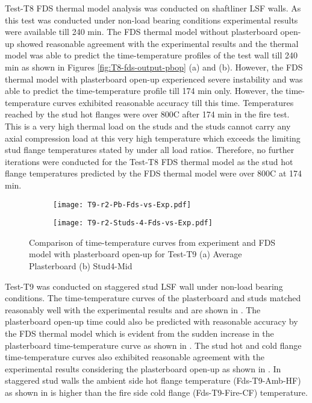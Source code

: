 Test-T8 FDS thermal model analysis was conducted on shaftliner LSF walls. As this test was conducted under non-load bearing conditions experimental results were available till 240 min. The FDS thermal model without plasterboard open-up showed reasonable agreement with the experimental results and the thermal model was able to predict the time-temperature profiles of the test wall till 240 min as shown in Figures \ref{fig:T8-fds-output-pbop} (a) and (b). However, the FDS thermal model with plasterboard open-up experienced severe instability and was able to predict the time-temperature profile till 174 min only. However, the time-temperature curves exhibited reasonable accuracy till this time. Temperatures reached by the stud hot flanges were over 800\degree C after 174 min in the fire test. This is a very high thermal load on the studs and the studs cannot carry any axial compression load at this very high temperature which exceeds the limiting stud flange temperatures stated by \citet{Gunalan2013a} under all load ratios. Therefore, no further iterations were conducted for the Test-T8 FDS thermal model as the stud hot flange temperatures predicted by the FDS thermal model were over 800\degree C at 174 min.   
\begin{figure}[!htbp]
	\centering
	\begin{subfigure}[b]{0.7\textwidth}
		\centering
		\texttt{[image: T9-r2-Pb-Fds-vs-Exp.pdf]}
		\caption{}
		\label{subfig:T9-r2-Pb-Fds-vs-Exp-pbop}
	\end{subfigure}
	\begin{subfigure}[b]{0.6\textwidth}
		\centering
		\texttt{[image: T9-r2-Studs-4-Fds-vs-Exp.pdf]}
		\caption{}
		\label{subfig:T9-r2-Studs-4-Fds-vs-Exp-pbop}
	\end{subfigure}
	   \caption{Comparison of time-temperature curves from experiment and FDS model with plasterboard open-up for Test-T9 (a) Average Plasterboard (b) Stud4-Mid}
	   \label{fig:T9-fds-output-pbop}
\end{figure}

Test-T9 was conducted on staggered stud LSF wall under non-load bearing conditions. The time-temperature curves of the plasterboard and studs matched reasonably well with the experimental results and are shown in . The plasterboard open-up time could also be predicted with reasonable accuracy by the FDS thermal model which is evident from the sudden increase in the plasterboard time-temperature curve as shown in . The stud hot and cold flange time-temperature curves also exhibited reasonable agreement with the experimental results considering the plasterboard open-up as shown in . In staggered stud walls the ambient side hot flange temperature (Fds-T9-Amb-HF) as shown in  is higher than the fire side cold flange (Fds-T9-Fire-CF) temperature.  

